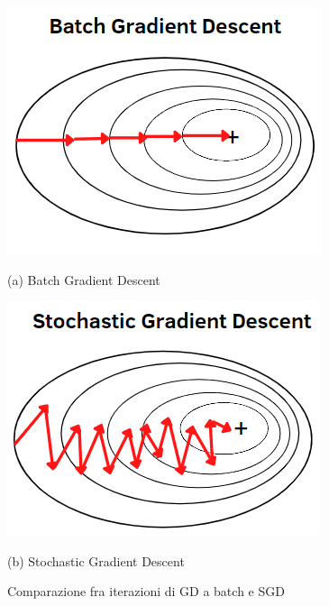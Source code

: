 \documentclass[12pt,a4paper,openright,twoside]{report}
\begin{document}
\begin{figure}[h]
\begin{minipage}[t]{0.49\linewidth}
\centering
\includegraphics[width=\linewidth]{batchGD.png}

(a) Batch Gradient Descent
\end{minipage}%
\hfill\vrule\hfill
\begin{minipage}[t]{0.49\linewidth}
\centering
\includegraphics[width=\linewidth]{SGD.png}

(b)  Stochastic Gradient Descent
\end{minipage}
\caption{Comparazione fra iterazioni di GD a batch e SGD }
\end{figure}
\end{document}
